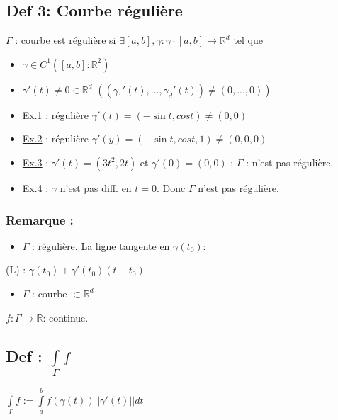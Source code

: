 \documentclass[11pt]{article}
\begin{document}
\subsection{Def 3: Courbe régulière}
\label{sec:orgheadline18}
\(\Gamma\) : courbe est régulière si \(\exists \left[a,b\right], \gamma: \gamma \cdot \left[a,b\right] \rightarrow \mathbb{R}^d\) tel que
\begin{itemize}
\item \(\gamma \in C^1 \left(\left[a,b\right]: \mathbb{R}^2\right)\)
\item \(\gamma ' (t) \neq 0 \in \mathbb{R}^d\) \(\left( \left(\gamma_1'(t),...,\gamma_d'(t) \right) \neq (0,...,0) \right)\)
\end{itemize}
\begin{itemize}
\item \hyperref[sec:orgheadline10]{Ex.1} : régulière \(\gamma'(t) = (-\sin t, cos t) \neq (0,0)\)
\item \hyperref[sec:orgheadline11]{Ex.2} : régulière \(\gamma'(y) = (-\sin t, cos t, 1) \neq (0,0,0)\)
\item \hyperref[sec:orgheadline12]{Ex.3} : \(\gamma' (t) = (3t^2,2t)\) et \(\gamma'(0) = (0,0)\) : \(\Gamma\) : n'est pas régulière.
\item Ex.4 : \(\gamma\) n'est pas diff. en \(t=0\). Donc \(\Gamma\) n'est pas régulière.
\end{itemize}

\subsubsection{Remarque :}
\label{sec:orgheadline17}
\begin{itemize}
\item \(\Gamma\) : régulière. La ligne tangente en \(\gamma(t_0)\):
\end{itemize}
(L) : \(\gamma(t_0) + \gamma'(t_0)(t-t_0)\)

\begin{itemize}
\item \(\Gamma\) : courbe \(\subset \mathbb{R}^d\)
\end{itemize}

\(f: \Gamma \rightarrow \mathbb{R}\): continue.

\subsection{Def : \(\int\limits_{\Gamma} f\)}
\label{sec:orgheadline22}
\(\int\limits_{\Gamma} f := \int\limits_{a}^{b} f(\gamma(t)) ||\gamma'(t)|| dt\)
\end{document}
